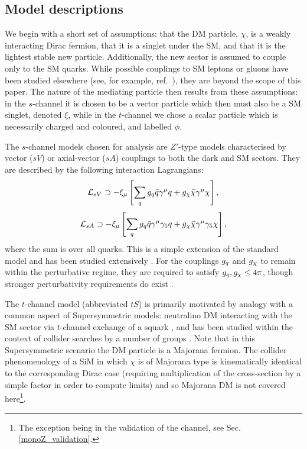 \subsection{Model descriptions}
We begin with a short set of assumptions: that the DM particle, $\chi$, is a weakly interacting Dirac fermion, that it is a singlet under the SM, and that it is the lightest stable new particle.
Additionally, the new sector is assumed to couple only to the SM quarks. While possible couplings to SM leptons or gluons have been studied elsewhere (see, for example, ref.~\cite{Fox:2011fx, SiM_gluons}), they are beyond the scope of this paper. The nature of the mediating particle then results from these assumptions: in the $s$-channel it is chosen to be a vector particle which then must also be a SM singlet, denoted $\xi$, while in the $t$-channel we chose a scalar particle which is necessarily charged and coloured, and labelled $\phi$.

The $s$-channel models chosen for analysis are $Z'$-type models characterised by vector ($sV$) or axial-vector ($sA$) couplings to both the dark and SM sectors. They are described by the following interaction Lagrangians:
\begin{equation}
\label{L_int_sV}
\mathcal{L}_{sV} \supset - \xi_{\mu}\left[ \sum\limits_{q} g_q\bar{q}\gamma^{\mu}q + g_{\chi}\bar{\chi}\gamma^{\mu}\chi\right],
\end{equation}
\begin{equation}
\label{L_int_sA}
\mathcal{L}_{sA} \supset - \xi_{\mu}\left[\sum\limits_{q} g_q\bar{q}\gamma^{\mu}\gamma_{5}q + g_{\chi}\bar{\chi}\gamma^{\mu}\gamma_{5}\chi\right],
\end{equation}
where the sum is over all quarks. This is a simple extension of the standard model and has been studied extensively \cite{Buchmueller:2014yoa, Heisig:2015ira,Blennow:2015gta,Lebedev:2014bba, Alves:2015pea, Alves:2013tqa, Alves:2015mua, An:2012va, An:2012ue, Frandsen:2012rk, Arcadi:2013qia, Shoemaker:2011vi, Frandsen:2011cg, Gondolo:2011eq, Fairbairn:2014aqa, Harris:2014hga, NordstromSVD, Bell:2015rdw, Chala:2015ama, Kahlhoefer:2015bea}.
For the couplings $g_q$ and $g_{\chi}$ to remain within the perturbative regime, they are required to satisfy $g_q,g_{\chi} \leq 4\pi$, though stronger perturbativity requirements do exist \cite{ValidEFT}.

The $t$-channel model (abbreviated $tS$) is primarily motivated by analogy with a common aspect of Supersymmetric models: neutralino DM interacting with the SM sector via $t$-channel exchange of a squark \cite{SUSYDM}, and has been studied within the context of collider searches by a number of groups \cite{DiFranzo:2013vra, Bai:2013iqa, An:2013xka, Chang:2013oia, Zurek:tchannel, Garny:2015wea,  Garny:2014waa, Bell:2011if, Bell:2015rdw}. Note that in this Supersymmetric scenario the DM particle is a Majorana fermion. The collider phenomenology of a SiM in which $\chi$ is of Majorana type is kinematically identical to the corresponding Dirac case (requiring multiplication of the cross-section by a simple factor in order to compute limits) and so Majorana DM is not covered here\footnote{The exception being in the validation of the \monoZ channel, see Sec. \ref{monoZ_validation}.}.

